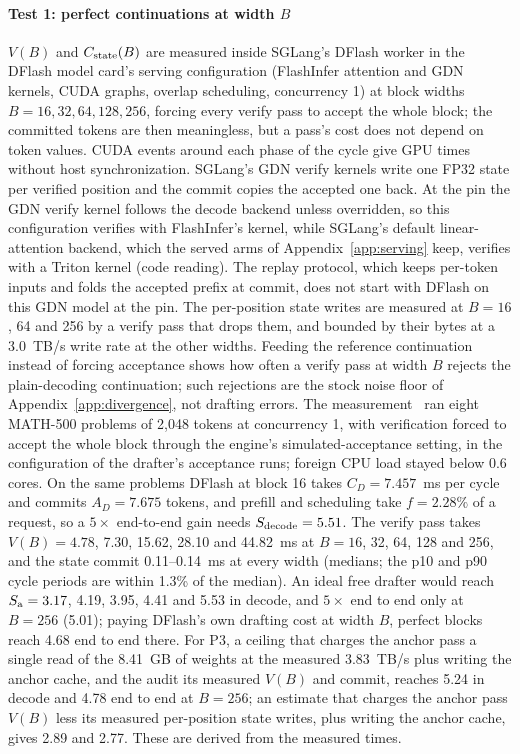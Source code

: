\paragraph{Test 1: perfect continuations at width $B$}\label{sec:repair-stagea} $V(B)$ and $C_{\rm state}(B)$ are measured inside SGLang's DFlash worker in the DFlash model card's serving configuration (FlashInfer attention and GDN kernels, CUDA graphs, overlap scheduling, concurrency 1) at block widths $B=16,32,64,128,256$, forcing every verify pass to accept the whole block; the committed tokens are then meaningless, but a pass's cost does not depend on token values. CUDA events around each phase of the cycle give GPU times without host synchronization. SGLang's GDN verify kernels write one FP32 state per verified position and the commit copies the accepted one back. At the pin the GDN verify kernel follows the decode backend unless overridden, so this configuration verifies with FlashInfer's kernel, while SGLang's default linear-attention backend, which the served arms of Appendix~\ref{app:serving} keep, verifies with a Triton kernel (code reading). The replay protocol, which keeps per-token inputs and folds the accepted prefix at commit, does not start with DFlash on this GDN model at the pin. The per-position state writes are measured at $B=16$, 64 and 256 by a verify pass that drops them, and bounded by their bytes at a 3.0~TB/s write rate at the other widths. Feeding the reference continuation instead of forcing acceptance shows how often a verify pass at width $B$ rejects the plain-decoding continuation; such rejections are the stock noise floor of Appendix~\ref{app:divergence}, not drafting errors. The measurement~ ran eight MATH-500 problems of 2,048 tokens at concurrency 1, with verification forced to accept the whole block through the engine's simulated-acceptance setting, in the configuration of the drafter's acceptance runs; foreign CPU load stayed below 0.6 cores. On the same problems DFlash at block 16 takes $C_D=7.457$~ms per cycle and commits $A_D=7.675$ tokens, and prefill and scheduling take $f=2.28\%$ of a request, so a $5\times$ end-to-end gain needs $S_{\rm decode}=5.51$. The verify pass takes $V(B)=4.78$, 7.30, 15.62, 28.10 and 44.82~ms at $B=16$, 32, 64, 128 and 256, and the state commit 0.11--0.14~ms at every width (medians; the p10 and p90 cycle periods are within 1.3\% of the median). An ideal free drafter would reach $S_{\rm a}=3.17$, 4.19, 3.95, 4.41 and 5.53 in decode, and $5\times$ end to end only at $B=256$ (5.01); paying DFlash's own drafting cost at width $B$, perfect blocks reach 4.68 end to end there. For P3, a ceiling that charges the anchor pass a single read of the 8.41~GB of weights at the measured 3.83~TB/s plus writing the anchor cache, and the audit its measured $V(B)$ and commit, reaches 5.24 in decode and 4.78 end to end at $B=256$; an estimate that charges the anchor pass $V(B)$ less its measured per-position state writes, plus writing the anchor cache, gives 2.89 and 2.77. These are derived from the measured times.

